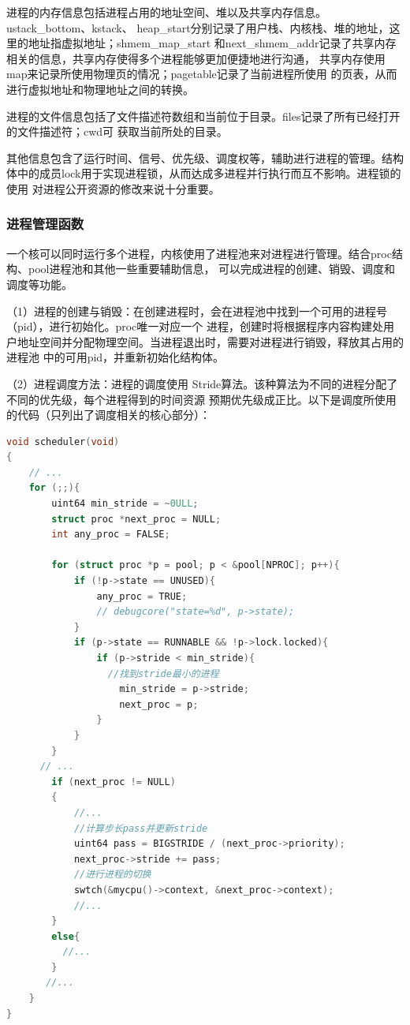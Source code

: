 \documentclass[UTF8,a4paper,10pt]{ctexart}
\begin{document}
进程的内存信息包括进程占用的地址空间、堆以及共享内存信息。ustack\_bottom、kstack、
heap\_start分别记录了用户栈、内核栈、堆的地址，这里的地址指虚拟地址；shmem\_map\_start
和next\_shmem\_addr记录了共享内存相关的信息，共享内存使得多个进程能够更加便捷地进行沟通，
共享内存使用map来记录所使用物理页的情况；pagetable记录了当前进程所使用
的页表，从而进行虚拟地址和物理地址之间的转换。

进程的文件信息包括了文件描述符数组和当前位于目录。files记录了所有已经打开的文件描述符；cwd可
获取当前所处的目录。

其他信息包含了运行时间、信号、优先级、调度权等，辅助进行进程的管理。结构体中的成员lock用于实现进程锁，从而达成多进程并行执行而互不影响。进程锁的使用
对进程公开资源的修改来说十分重要。

\subsubsection{进程管理函数}

一个核可以同时运行多个进程，内核使用了进程池来对进程进行管理。结合proc结构、pool进程池和其他一些重要辅助信息，
可以完成进程的创建、销毁、调度和调度等功能。

（1）进程的创建与销毁：在创建进程时，会在进程池中找到一个可用的进程号（pid），进行初始化。proc唯一对应一个
进程，创建时将根据程序内容构建处用户地址空间并分配物理空间。当进程退出时，需要对进程进行销毁，释放其占用的进程池
中的可用pid，并重新初始化结构体。

（2）进程调度方法：进程的调度使用 Stride算法。该种算法为不同的进程分配了不同的优先级，每个进程得到的时间资源
预期优先级成正比。以下是调度所使用的代码（只列出了调度相关的核心部分）：

\begin{lstlisting}[title=进程调度方法,frame=trbl,language={C}]
void scheduler(void)
{
    // ...
    for (;;){
        uint64 min_stride = ~0ULL;
        struct proc *next_proc = NULL;
        int any_proc = FALSE;

        for (struct proc *p = pool; p < &pool[NPROC]; p++){
            if (!p->state == UNUSED){
                any_proc = TRUE;
                // debugcore("state=%d", p->state);
            }
            if (p->state == RUNNABLE && !p->lock.locked){
                if (p->stride < min_stride){
                  //找到stride最小的进程
                    min_stride = p->stride;
                    next_proc = p;
                }
            }
        }
      // ...
        if (next_proc != NULL)
        {
            //...
            //计算步长pass并更新stride
            uint64 pass = BIGSTRIDE / (next_proc->priority);
            next_proc->stride += pass;
            //进行进程的切换
            swtch(&mycpu()->context, &next_proc->context);
            //...
        }
        else{
          //...
        }
       //...
    }
}
  \end{lstlisting}
\end{document}
